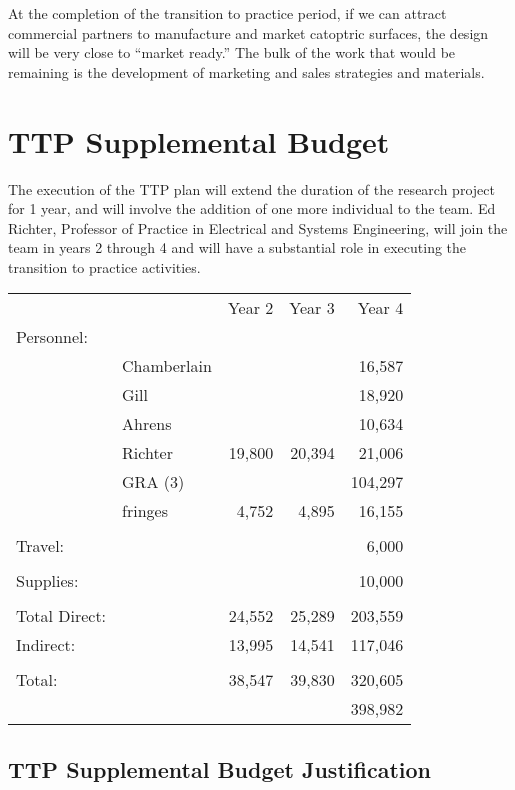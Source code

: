 \documentclass[11pt]{article}
\begin{document}
At the completion of the transition to practice period, if we can
attract commercial partners to manufacture and market catoptric surfaces,
the design will be very close to ``market ready.''  The bulk of the
work that would be remaining is the development of marketing and sales
strategies and materials.

\section{TTP Supplemental Budget}

The execution of the TTP plan will extend the duration of the research
project for 1 year, and will involve the addition of one more individual
to the team.  Ed Richter, Professor of Practice in Electrical and Systems
Engineering, will join the team in years 2 through 4 and will have a
substantial role in executing the transition to practice activities.

\newpage
\begin{table}[h]
\centering
\begin{tabular}{l l r r r}
\ & & Year 2 & Year 3 & Year 4 \\ 
Personnel: & & & & \\
\ & Chamberlain & & & 16,587 \\ 
\ & Gill & & & 18,920 \\ 
\ & Ahrens & & & 10,634 \\ 
\ & Richter & 19,800 & 20,394 & 21,006 \\ 
\ & GRA (3) & & & 104,297 \\
\ & fringes & 4,752 & 4,895 & 16,155 \\ \\
Travel: & & & & 6,000 \\ \\
Supplies: & & & & 10,000 \\ \\
Total Direct: & & 24,552 & 25,289 & 203,559 \\
Indirect: & & 13,995 & 14,541 & 117,046 \\ \\
Total: & & 38,547 & 39,830 & 320,605 \\ \hline
\ & & & & 398,982
\end{tabular}
\end{table}

\subsection*{TTP Supplemental Budget Justification}
\end{document}
